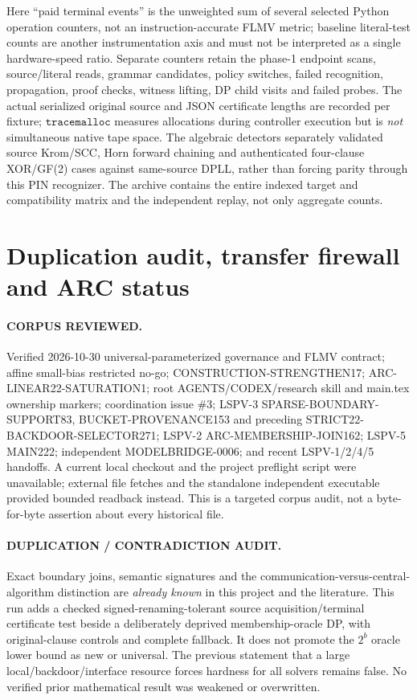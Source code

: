 \documentclass[11pt]{article}
\begin{document}
Here ``paid terminal events'' is the unweighted sum of several selected Python operation counters, not an instruction-accurate FLMV metric; baseline literal-test counts are another instrumentation axis and must not be interpreted as a single hardware-speed ratio. Separate counters retain the phase-1 endpoint scans, source/literal reads, grammar candidates, policy switches, failed recognition, propagation, proof checks, witness lifting, DP child visits and failed probes. The actual serialized original source and JSON certificate lengths are recorded per fixture; $\mathtt{tracemalloc}$ measures allocations during controller execution but is \emph{not} simultaneous native tape space. The algebraic detectors separately validated source Krom/SCC, Horn forward chaining and authenticated four-clause XOR/GF(2) cases against same-source DPLL, rather than forcing parity through this PIN recognizer. The archive contains the entire indexed target and compatibility matrix and the independent replay, not only aggregate counts.

\section{Duplication audit, transfer firewall and ARC status}
\paragraph{CORPUS REVIEWED.} Verified 2026-10-30 universal-parameterized governance and FLMV contract; affine small-bias restricted no-go; CONSTRUCTION-STRENGTHEN17; ARC-LINEAR22-SATURATION1; root AGENTS/CODEX/research skill and main.tex ownership markers; coordination issue \#3; LSPV-3 SPARSE-BOUNDARY-SUPPORT83, BUCKET-PROVENANCE153 and preceding STRICT22-BACKDOOR-SELECTOR271; LSPV-2 ARC-MEMBERSHIP-JOIN162; LSPV-5 MAIN222; independent MODELBRIDGE-0006; and recent LSPV-1/2/4/5 handoffs. A current local checkout and the project preflight script were unavailable; external file fetches and the standalone independent executable provided bounded readback instead. This is a targeted corpus audit, not a byte-for-byte assertion about every historical file.

\paragraph{DUPLICATION / CONTRADICTION AUDIT.} Exact boundary joins, semantic signatures and the communication-versus-central-algorithm distinction are \emph{already known} in this project and the literature. This run adds a checked signed-renaming-tolerant source acquisition/terminal certificate test beside a deliberately deprived membership-oracle DP, with original-clause controls and complete fallback. It does not promote the $2^b$ oracle lower bound as new or universal. The previous statement that a large local/backdoor/interface resource forces hardness for all solvers remains false. No verified prior mathematical result was weakened or overwritten.
\end{document}
